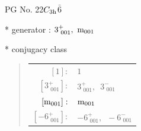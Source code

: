\documentclass[fleqn,8pt]{jsarticle}
\begin{document}
\setcounter{MaxMatrixCols}{32}

\renewcommand{\tablename}{Table~}
\renewcommand{\figurename}{Figure~}
\begin{center}
\LARGE
PG No. 22\quad$C_{\rm 3h}$\quad$\bar{6}$\quad[ hexagonal ]
\end{center}

* generator : $3^{+}_{\,\,001},\,\,{\rm m}_{001}$

* conjugacy class
\begin{quote}
\begin{tabular}{rl}
$ [1]: $ & $ 1 $ \\
$ [3^{+}_{\,\,001}]: $ & $ 3^{+}_{\,\,001},\,\,\,3^{-}_{\,\,001} $ \\
$ [{\rm m}_{001}]: $ & $ {\rm m}_{001} $ \\
$ [-6^{+}_{\,\,001}]: $ & $ -6^{+}_{\,\,001},\,\,\,-6^{-}_{\,\,001} $
\end{tabular}
\end{quote}
\end{document}
